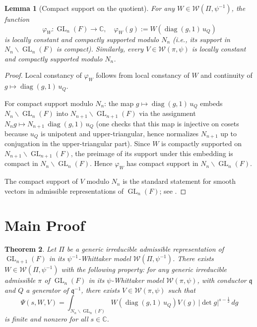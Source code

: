 \documentclass[12pt]{article}
\newtheorem{theorem}{Theorem}
\newtheorem{lemma}[theorem]{Lemma}
\theoremstyle{definition}
\DeclareMathOperator{\diag}{diag}
\DeclareMathOperator{\GL}{GL}
\begin{document}
\begin{lemma}[Compact support on the quotient]
  \label{lem:compact}
  For any $W \in \mathcal{W}(\Pi, \psi^{-1})$, the function
  \[
    \varphi_W \colon \GL_n(F) \to \mathbb{C}, \quad
    \varphi_W(g) := W(\diag(g,1)\,u_Q)
  \]
  is locally constant and compactly supported modulo $N_n$ (i.e., its support in
  $N_n \backslash \GL_n(F)$ is compact). Similarly, every $V \in \mathcal{W}(\pi, \psi)$
  is locally constant and compactly supported modulo $N_n$.
\end{lemma}

\begin{proof}
  Local constancy of $\varphi_W$ follows from local constancy of $W$ and continuity of
  $g \mapsto \diag(g,1)\,u_Q$.

  For compact support modulo $N_n$: the map $g \mapsto \diag(g,1)\,u_Q$ embeds
  $N_n \backslash \GL_n(F)$ into $N_{n+1} \backslash \GL_{n+1}(F)$ via the assignment
  $N_n g \mapsto N_{n+1}\,\diag(g,1)\,u_Q$ (one checks that this map is injective on
  cosets because $u_Q$ is unipotent and upper-triangular, hence normalizes $N_{n+1}$ up
  to conjugation in the upper-triangular part). Since $W$ is compactly supported on
  $N_{n+1} \backslash \GL_{n+1}(F)$, the preimage of its support under this embedding is
  compact in $N_n \backslash \GL_n(F)$. Hence $\varphi_W$ has compact support in
  $N_n \backslash \GL_n(F)$.

  The compact support of $V$ modulo $N_n$ is the standard statement for smooth vectors
  in admissible representations of $\GL_n(F)$; see \cite[Proposition 2.3]{BZ76}.
\end{proof}

\section*{Main Proof}

\begin{theorem}
  \label{thm:main}
  Let $\Pi$ be a generic irreducible admissible representation of $\GL_{n+1}(F)$ in its
  $\psi^{-1}$-Whittaker model $\mathcal{W}(\Pi, \psi^{-1})$.
  There exists $W \in \mathcal{W}(\Pi, \psi^{-1})$ with the following property:
  for any generic irreducible admissible $\pi$ of $\GL_n(F)$ in its $\psi$-Whittaker
  model $\mathcal{W}(\pi, \psi)$, with conductor $\mathfrak{q}$ and $Q$ a generator
  of $\mathfrak{q}^{-1}$, there exists $V \in \mathcal{W}(\pi, \psi)$ such that
  \[
    \Psi(s, W, V) = \int_{N_n \backslash \GL_n(F)}
      W\!\left(\diag(g,1)\,u_Q\right) V(g)\,|\det g|^{s-\frac{1}{2}}\,dg
  \]
  is finite and nonzero for all $s \in \mathbb{C}$.
\end{theorem}
\end{document}
